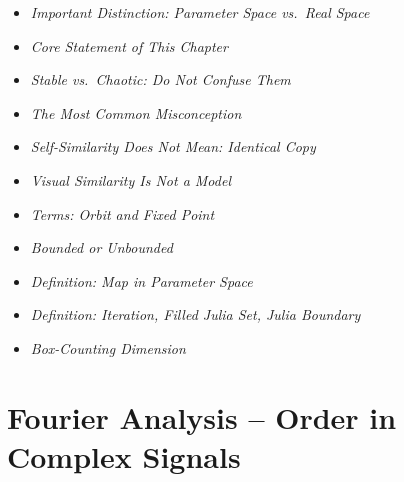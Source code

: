 \begin{NoteBox}
	
	\begin{itemize}
		\item \emph{Important Distinction: \newline Parameter Space vs.\ Real Space}\dotfill \pageref{box:distinction}
		\item \emph{Core Statement of This Chapter}\dotfill \pageref{box:corestatement}
	\end{itemize}
\end{NoteBox}

\begin{DidacticBox}
	\begin{itemize}
		\item \emph{Stable vs.\ Chaotic: Do Not Confuse Them}\dotfill \pageref{box:stable}
		\item \emph{The Most Common Misconception}\dotfill \pageref{box:misconception}
		\item \emph{Self-Similarity Does Not Mean: Identical Copy}\dotfill \pageref{box:copy}
		\item \emph{Visual Similarity Is Not a Model}\dotfill \pageref{box:visual}
	\end{itemize}
\end{DidacticBox}

\begin{MathBox}
	
	\begin{itemize}
		\item \emph{Terms: Orbit and Fixed Point}\dotfill \pageref{box:orbit}
		\item \emph{Bounded or Unbounded}\dotfill \pageref{box:bounded}
		\item \emph{Definition: Map in Parameter Space}\dotfill \pageref{box:map}
		\item \emph{Definition: Iteration, Filled \newline Julia Set, Julia Boundary}\dotfill \pageref{box:iteration}
		\item \emph{Box-Counting Dimension}\dotfill \pageref{box:boxcounting}
	\end{itemize}
\end{MathBox}


\section{Fourier Analysis -- Order in Complex Signals}

